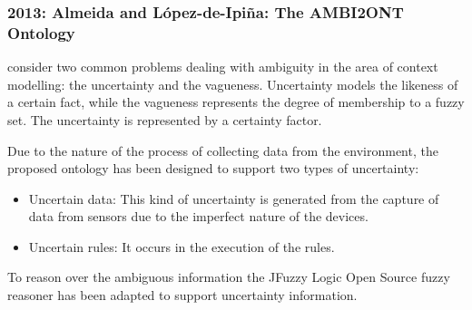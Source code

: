 \subsubsection{2013: Almeida and López-de-Ipiña: The AMBI2ONT Ontology}
\label{sec:almeida}

\citet{almeida_assessing_2012} consider two common problems dealing with 
ambiguity in the area of context modelling: the uncertainty and the vagueness. 
Uncertainty models the likeness of a certain fact, while the vagueness 
represents the degree of membership to a fuzzy set. The uncertainty is 
represented by a certainty factor.

Due to the nature of the process of collecting data from the environment, the
proposed ontology has been designed to support two types of uncertainty:

\begin{itemize}
  \item Uncertain data: This kind of uncertainty is generated from the capture
  of data from sensors due to the imperfect nature of the devices.
  \item Uncertain rules: It occurs in the execution of the rules. 
\end{itemize}

To reason over the ambiguous information the JFuzzy Logic Open Source fuzzy
reasoner has been adapted to support uncertainty information.
